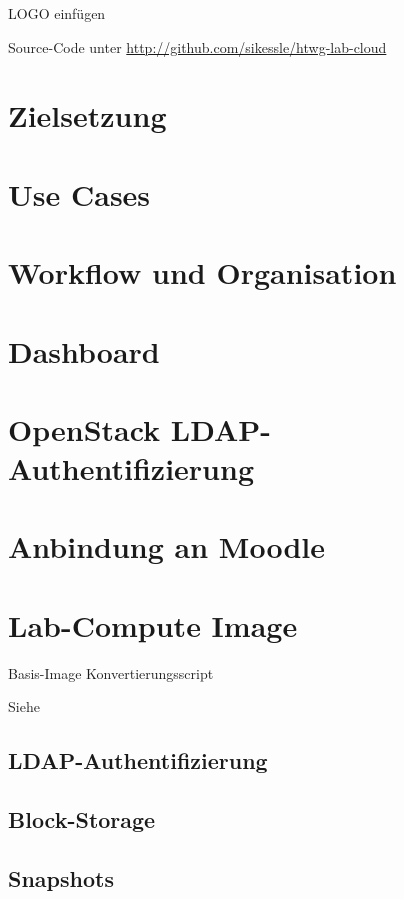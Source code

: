 LOGO einfügen

Source-Code unter \url{http://github.com/sikessle/htwg-lab-cloud}

\section{Zielsetzung}

\section{Use Cases}

\section{Workflow und Organisation}

\section{Dashboard}

\section{OpenStack LDAP-Authentifizierung}

\section{Anbindung an Moodle}

\section{Lab-Compute Image}

Basis-Image
Konvertierungsscript

Siehe \cite{erling_emissionshandel_2008}

\subsection{LDAP-Authentifizierung}

\subsection{Block-Storage}

\subsection{Snapshots}


